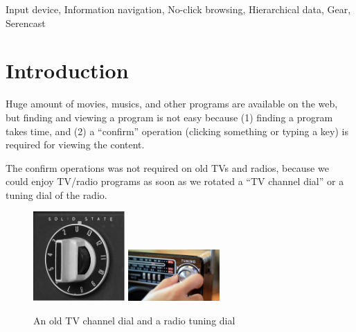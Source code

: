 \documentclass[conference]{IEEEtran}
\begin{document}
\begin{IEEEkeywords}
  Input device, Information navigation, No-click browsing,
  Hierarchical data, Gear, Serencast
\end{IEEEkeywords}


\section{Introduction}

% 

Huge amount of movies, musics, and other programs are available on the web, but
finding and viewing a program is not easy because
(1) finding a program takes time, and
(2) a ``confirm'' operation (clicking something or typing a key)
is required for viewing the content.


The confirm operations was not required on old TVs and radios,
because we could enjoy TV/radio programs
as soon as we rotated a ``TV channel dial'' or a tuning dial of the radio.

\begin{figure}[H]
\centerline{
   \includegraphics[width=35mm,bb=0 0 279 272]{figures/9bd96506bdaac48b26c5cd192851c11d.png}
   \includegraphics[width=35mm,bb=0 0 128 72]{figures/fedc4f3c899c48b5a3ddd0982801c79d.png}
}
\caption{An old TV channel dial and a radio tuning dial}
\label{TV channel}
\end{figure}


\end{document}
